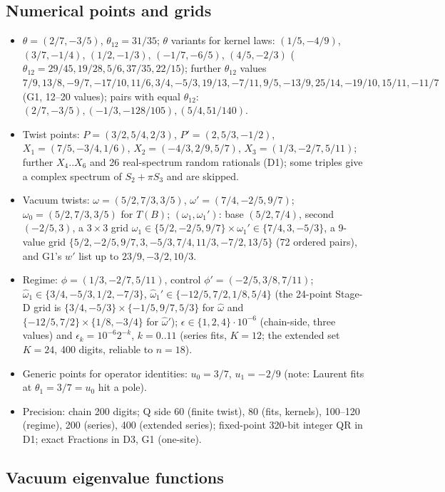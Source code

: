 \documentclass[11pt]{article}
\begin{document}
\subsection{Numerical points and grids}\label{app:grids}

\begin{itemize}
\item $\theta=(2/7,-3/5)$, $\theta_{12}=31/35$; $\theta$ variants for kernel laws: $(1/5,-4/9)$, $(3/7,-1/4)$, $(1/2,-1/3)$, $(-1/7,-6/5)$, $(4/5,-2/3)$ ($\theta_{12}=29/45,19/28,5/6,37/35,22/15$); further $\theta_{12}$ values $7/9,13/8,-9/7,-17/10,11/6,3/4,-5/3,19/13,-7/11,9/5,-13/9,25/14,-19/10,15/11,-11/7$ (G1, 12--20 values); pairs with equal $\theta_{12}$: $(2/7,-3/5),(-1/3,-128/105),(5/4,51/140)$.
\item Twist points: $P=(3/2,5/4,2/3)$, $P'=(2,5/3,-1/2)$, $X_1=(7/5,-3/4,1/6)$, $X_2=(-4/3,2/9,5/7)$, $X_3=(1/3,-2/7,5/11)$; further $X_4..X_6$ and 26 real-spectrum random rationals (D1); some triples give a complex spectrum of $S_2+\pi S_3$ and are skipped.
\item Vacuum twists: $\omega=(5/2,7/3,3/5)$, $\omega'=(7/4,-2/5,9/7)$; $\omega_0=(5/2,7/3,3/5)$ for $T(B)$; $(\omega_1,\omega_1')$: base $(5/2,7/4)$, second $(-2/5,3)$, a $3\times3$ grid $\omega_1\in\{5/2,-2/5,9/7\}\times\omega_1'\in\{7/4,3,-5/3\}$, a 9-value grid $\{5/2,-2/5,9/7,3,-5/3,7/4,11/3,-7/2,13/5\}$ (72 ordered pairs), and G1's $w'$ list up to $23/9,-3/2,10/3$.
\item Regime: $\phi=(1/3,-2/7,5/11)$, control $\phi'=(-2/5,3/8,7/11)$; $\hat\omega_1\in\{3/4,-5/3,1/2,-7/3\}$, $\hat\omega_1'\in\{-12/5,7/2,1/8,5/4\}$ (the 24-point Stage-D grid is $\{3/4,-5/3\}\times\{-1/5,9/7,5/3\}$ for $\hat\omega$ and $\{-12/5,7/2\}\times\{1/8,-3/4\}$ for $\hat\omega'$); $\epsilon\in\{1,2,4\}\cdot10^{-6}$ (chain-side, three values) and $\epsilon_k=10^{-6}2^{-k}$, $k=0..11$ (series fits, $K=12$; the extended set $K=24$, 400 digits, reliable to $n=18$).
\item Generic points for operator identities: $u_0=3/7$, $u_1=-2/9$ (note: Laurent fits at $\theta_1=3/7=u_0$ hit a pole).
\item Precision: chain 200 digits; Q side 60 (finite twist), 80 (fits, kernels), 100--120 (regime), 200 (series), 400 (extended series); fixed-point 320-bit integer QR in D1; exact Fractions in D3, G1 (one-site).
\end{itemize}

\subsection{Vacuum eigenvalue functions}\label{app:vac}
\end{document}
